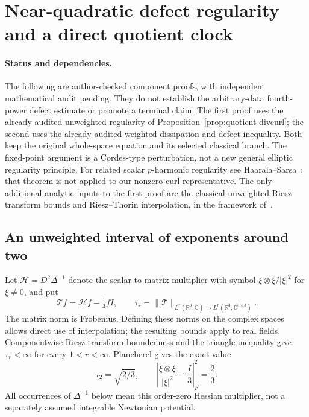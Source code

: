\section{Near-quadratic defect regularity and a direct quotient clock}
\label{de:section}

\paragraph{Status and dependencies.}
The following are author-checked component proofs, with independent
mathematical audit pending.  They do not establish the arbitrary-data
fourth-power defect estimate or promote a terminal claim.  The first proof
uses the already audited unweighted regularity of
Proposition~\ref{prop:quotient-divcurl}; the second uses the already audited
weighted dissipation and defect inequality.  Both keep the original
whole-space equation and its selected classical branch.  The fixed-point
argument is a Cordes-type perturbation, not a new general elliptic
regularity principle.  For related scalar $p$-harmonic regularity see
Haarala--Sarsa~\cite{HaaralaSarsa2022}; that theorem is not applied to our
nonzero-curl representative.  The only additional analytic inputs to the
first proof are the classical unweighted Riesz-transform bounds and
Riesz--Thorin interpolation, in the framework of~\cite{Stein1970}.

\subsection{An unweighted interval of exponents around two}

Let $\mathcal H=D^2\Delta^{-1}$ denote the scalar-to-matrix multiplier
with symbol $\xi\otimes\xi/|\xi|^2$ for $\xi\ne0$, and put
\[
 \mathcal T f=\mathcal H f-\tfrac13 fI,
 \qquad \tau_r=\|\mathcal T\|_{L^r(\mathbb R^3;\mathbb C)
                  \to L^r(\mathbb R^3;\mathbb C^{3\times3})}.
\]
The matrix norm is Frobenius.  Defining these norms on the complex spaces
allows direct use of interpolation; the resulting bounds apply to real
fields.  Componentwise Riesz-transform boundedness and the triangle
inequality give $\tau_r<\infty$ for every $1<r<\infty$.
Plancherel gives the exact value
\begin{equation}\label{de:tracefree-norm}
 \tau_2=\sqrt{2/3},
 \qquad
 \left|\frac{\xi\otimes\xi}{|\xi|^2}-\frac I3\right|_F^2=\frac23.
\end{equation}
All occurrences of $\Delta^{-1}$ below mean this order-zero Hessian
multiplier, not a separately assumed integrable Newtonian potential.

